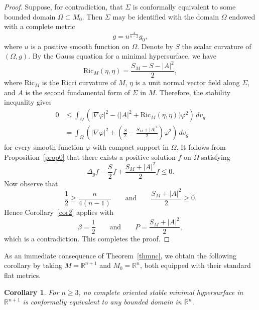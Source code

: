 \documentclass[amssymb,amstex,amsmath,11pt]{article}
\numberwithin{equation}{section}
\theoremstyle{plain}
\newtheorem{cor}[thm]{Corollary}
\theoremstyle{definition}
\theoremstyle{remark}
\def\Ric{\textrm{Ric}}
\begin{document}
\begin{proof}
    Suppose, for contradiction, that $\Sigma$ is conformally equivalent to some bounded domain $\Omega\subset M_0$. Then $\Sigma$ may be identified with the domain $\Omega$ endowed with a complete metric
    $$g=u^{\frac{4}{n-2}}g_0,$$
    where $u$ is a positive smooth function on $\Omega$. Denote by $S$ the scalar curvature of $(\Omega,g)$. By the Gauss equation for a minimal hypersurface, we have
    \begin{equation*}
        \Ric_M(\eta,\eta)=\frac{S_M-S-|A|^2}{2},
    \end{equation*}
    where $\Ric_M$ is the Ricci curvature of $M$, $\eta$ is a unit normal vector field along $\Sigma$, and $A$ is the second fundamental form of $\Sigma$ in $M$. Therefore, the stability inequality gives
    \begin{align*}
        0
        &\le \int_\Omega \left(|\nabla \varphi|^2-\bigl(|A|^2+\Ric_M(\eta,\eta)\bigr)\varphi^2\right)\,dv_g \\
        &= \int_\Omega \left(|\nabla \varphi|^2+\left(\frac{S}{2}-\frac{S_M+|A|^2}{2}\right)\varphi^2\right)\,dv_g
    \end{align*}
    for every smooth function $\varphi$ with compact support in $\Omega$. It follows from Proposition~\ref{prop0} that there exists a positive solution $f$ on $\Omega$ satisfying
    $$\Delta_g f-\frac{S}{2}f+\frac{S_M+|A|^2}{2}f\le 0.$$
    Now observe that
    $$\frac{1}{2}\ge \frac{n}{4(n-1)}
    \qquad \text{and} \qquad
    \frac{S_M+|A|^2}{2}\ge 0.$$
    Hence Corollary~\ref{cor2} applies with
    $$\beta=\frac{1}{2} \qquad \text{and} \qquad P=\frac{S_M+|A|^2}{2},$$
    which is a contradiction. This completes the proof.
\end{proof}







\noindent As an immediate consequence of Theorem~\ref{thmnc}, we obtain the following corollary by taking $M=\mathbb{R}^{n+1}$ and $M_0=\mathbb{R}^n$, both equipped with their standard flat metrics.



\begin{cor}\label{cnce}
For $n\ge 3$, no complete oriented stable minimal hypersurface in $\mathbb{R}^{n+1}$ is conformally equivalent to any bounded domain in $\mathbb{R}^n$.
\end{cor}
\end{document}
